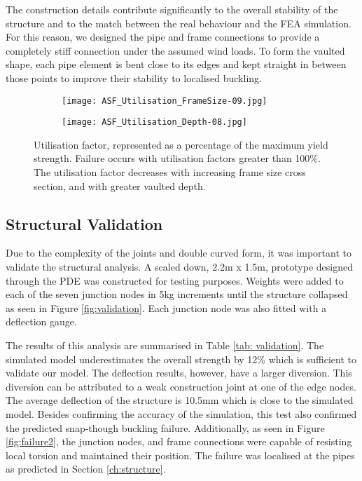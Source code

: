 The construction details contribute significantly to the overall stability of the structure and to the match between the real behaviour and the FEA simulation. For this reason, we designed the pipe and frame connections to provide a completely stiff connection under the assumed wind loads. To form the vaulted shape, each pipe element is bent close to its edges and kept straight in between those points to improve their stability to localised buckling.


\begin{figure}
    \centering
    \begin{subfigure}[b]{0.8\columnwidth}
        \texttt{[image: ASF\_Utilisation\_FrameSize-09.jpg]}
        \caption{} 
        \label{fig:frameSize}
    \end{subfigure} 
    \vspace{10mm}

    \begin{subfigure}[b]{0.8\columnwidth}
        \texttt{[image: ASF\_Utilisation\_Depth-08.jpg]}
        \caption{}
        \label{fig:StructuralDepth}
    \end{subfigure}
    \hfill

    \caption{Utilisation factor, represented as a percentage of the maximum yield strength. Failure occurs with utilisation factors greater than 100\%. The utilisation factor decreases with increasing frame size cross section, and with greater vaulted depth.}
    \label{fig:utilisation}
\end{figure}

\subsection{Structural Validation}

Due to the complexity of the joints and double curved form, it was important to validate the structural analysis. A scaled down, 2.2m x 1.5m, prototype designed through the PDE was constructed for testing purposes. Weights were added to each of the seven junction nodes in 5kg increments until the structure collapsed as seen in Figure \ref{fig:validation}. Each junction node was also fitted with a deflection gauge.

The results of this analysis are summarised in Table \ref{tab: validation}. The simulated model underestimates the overall strength by 12\% which is sufficient to validate our model. The deflection results, however, have a larger diversion. This diversion can be attributed to a weak construction joint at one of the edge nodes. The average deflection of the structure is 10.5mm which is close to the simulated model. Besides confirming the accuracy of the simulation, this test also confirmed the predicted snap-though buckling failure. Additionally, as seen in Figure \ref{fig:failure2}, the junction nodes, and frame connections were capable of resisting local torsion and maintained their position. The failure was localised at the pipes as predicted in Section \ref{ch:structure}. 

